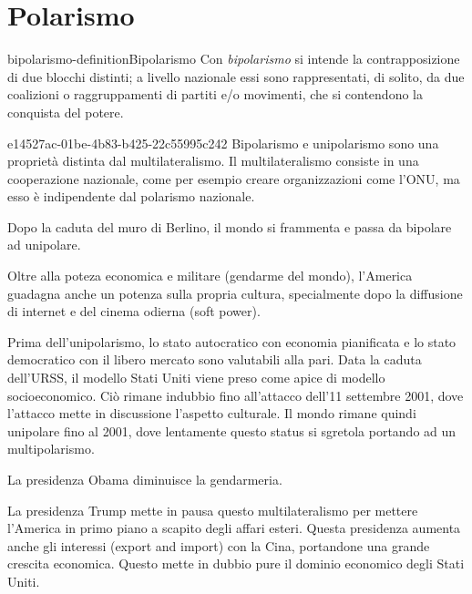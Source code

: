 \documentclass[preview]{standalone}
\begin{document}
\genpage

\section{Polarismo}

\begin{snippetdefinition}{bipolarismo-definition}{Bipolarismo}
    Con \textit{bipolarismo} si intende la contrapposizione di due blocchi distinti;
    a livello nazionale essi sono rappresentati, di solito, da due coalizioni o
    raggruppamenti di partiti e/o movimenti, che si contendono la conquista del potere.
\end{snippetdefinition}

\begin{snippet}{e14527ac-01be-4b83-b425-22c55995c242}
    Bipolarismo e unipolarismo sono una proprietà distinta dal multilateralismo.
    Il multilateralismo consiste in una cooperazione nazionale, come per esempio creare organizzazioni
    come l'ONU, ma esso è indipendente dal polarismo nazionale.

    Dopo la caduta del muro di Berlino, il mondo si frammenta e passa da bipolare ad unipolare.

    Oltre alla poteza economica e militare (gendarme del mondo), l'America
    guadagna anche un potenza sulla propria cultura, specialmente dopo la diffusione di internet
    e del cinema odierna (soft power).

    Prima dell'unipolarismo, lo stato autocratico con economia pianificata e
    lo stato democratico con il libero mercato sono valutabili alla pari.
    Data la caduta dell'URSS, il modello Stati Uniti viene preso come apice
    di modello socioeconomico.
    Ciò rimane indubbio fino all'attacco dell'11 settembre 2001, dove l'attacco mette
    in discussione l'aspetto culturale.
    Il mondo rimane quindi unipolare fino al 2001, dove lentamente questo status si sgretola
    portando ad un multipolarismo.

    La presidenza Obama diminuisce la gendarmeria.

    La presidenza Trump mette in pausa questo multilateralismo per mettere l'America
    in primo piano a scapito degli affari esteri.
    Questa presidenza aumenta anche gli interessi (export and import) con la Cina, portandone
    una grande crescita economica. Questo mette in dubbio pure
    il dominio economico degli Stati Uniti.
\end{snippet}
\end{document}
